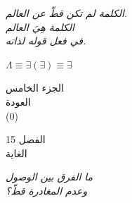 \documentclass[10pt, openany, oneside]{book}
\renewcommand{\normalsize}{\fontsize{10}{13}\selectfont}
\renewcommand{\large}{\fontsize{11.5}{14}\selectfont}
\renewcommand{\LARGE}{\fontsize{15}{18}\selectfont}
\renewcommand{\huge}{\fontsize{17}{21}\selectfont}
\begin{document}
\vspace{0.5em}

\begin{center}
    \itshape
    الكلمة لم تكن قطّ عن العالم.\\
    الكلمة هِيَ العالم\\
    في فعل قوله لذاته.
\end{center}

\vspace{0.5em}

\begin{center}
    $\Lambda \equiv \exists(\exists) \equiv \exists$
\end{center}


\newpage
\thispagestyle{empty}
\vspace*{\fill}
\begin{center}
    {\LARGE الجزء الخامس}\\[1em]
    {\large العودة}\\[0.5em]
    {\normalsize ($0$)}
\end{center}
\vspace*{\fill}
\newpage

%
%
%

\newpage

\begin{center}
    {\huge الفصل 15}\\[0.3em]
    {\large الغاية}
\end{center}

\vspace{1.5em}

\begin{center}
    \itshape
    ما الفرق بين الوصول\\
    وعدم المغادرة قطّ؟
\end{center}

\vspace{2em}

\end{document}
